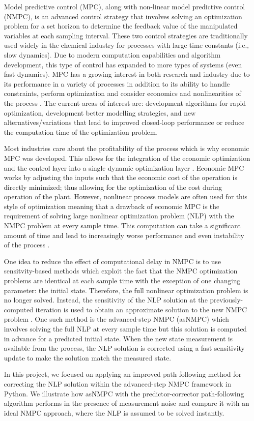 Model predictive control (MPC), along with non-linear model predictive control (NMPC), is an advanced control strategy that involves solving an optimization problem for a set horizon to determine the feedback value of the manipulated variables at each sampling interval.
These two control strategies are traditionally used widely in the chemical industry for processes with large time constants (i.e., slow dynamics).
Due to modern computation capabilities and algorithm development, this type of control has expanded to more types of systems (even fast dynamics).
MPC has a growing interest in both research and industry due to its performance in a variety of processes in addition to its ability to handle constraints, perform optimization and consider economics and nonlinearities of the process \cite{framework}.
The current areas of interest are: development algorithms for rapid optimization, development better modelling strategies, and new alternatives/variations that lead to improved closed-loop performance or reduce the computation time of the optimization problem.
\par
Most industries care about the profitability of the process which is why economic MPC was developed.
This allows for the integration of the economic optimization and the control layer into a single dynamic optimization layer \cite{economic}.
Economic MPC works by adjusting the inputs such that the economic cost of the operation is directly minimized; thus allowing for the optimization of the cost during operation of the plant.
However, nonlinear process models are often used for this style of optimization meaning that a drawback of economic MPC is the requirement of solving large nonlinear optimization problem (NLP) with the NMPC problem at every sample time.
This computation can take a significant amount of time and lead to increasingly worse performance and even instability of the process \cite{economic}.
\par
One idea to reduce the effect of computational delay in NMPC is to use sensitvity-based methods which exploit the fact that the NMPC optimization problems are identical at each sample time with the exception of one changing parameter: the initial state.
Therefore, the full nonlinear optimization problem is no longer solved.
Instead, the sensitivity of the NLP solution at the previously-computed iteration is used to obtain an approximate solution to the new NMPC problem \cite{economic}.
One such method is the advanced-step NMPC (asNMPC) which involves solving the full NLP at every sample time but this solution is computed in advance for a predicted initial state.
When the new state measurement is available from the process, the NLP solution is corrected using a fast sensitivity update to make the solution match the measured state.
\par
In this project, we focused on applying an improved path-following method for correcting the NLP solution within the advanced-step NMPC framework in Python. 
We illustrate how asNMPC with the predictor-corrector path-following algorithm performs in the presence of measurement noise and compare it with an ideal NMPC approach, where the NLP is assumed to be solved instantly.
